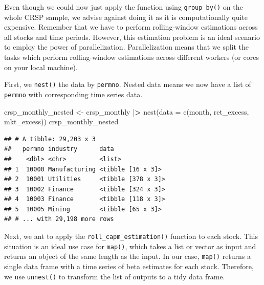 \documentclass[
]{book}
\newenvironment{Shaded}{\begin{snugshade}}{\end{snugshade}}
\newcommand{\AttributeTok}[1]{\textcolor[rgb]{0.61,0.61,0.61}{#1}}
\newcommand{\ErrorTok}[1]{\textcolor[rgb]{0.14,0.14,0.14}{\textbf{#1}}}
\newcommand{\FunctionTok}[1]{\textcolor[rgb]{0,0,0}{#1}}
\newcommand{\NormalTok}[1]{#1}
\newcommand{\OtherTok}[1]{\textcolor[rgb]{0.37,0.37,0.37}{#1}}
\newcommand{\SpecialCharTok}[1]{\textcolor[rgb]{0,0,0}{#1}}
\begin{document}
Even though we could now just apply the function using \texttt{group\_by()} on the whole CRSP sample, we advise against doing it as it is computationally quite expensive.
Remember that we have to perform rolling-window estimations across all stocks and time periods.
However, this estimation problem is an ideal scenario to employ the power of parallelization.
Parallelization means that we split the tasks which perform rolling-window estimations across different workers (or cores on your local machine).

First, we \texttt{nest()} the data by \texttt{permno}. Nested data means we now have a list of \texttt{permno} with corresponding time series data.

\begin{Shaded}
\begin{Highlighting}[]
\NormalTok{crsp\_monthly\_nested }\OtherTok{\textless{}{-}}\NormalTok{ crsp\_monthly }\SpecialCharTok{|}\ErrorTok{\textgreater{}}
  \FunctionTok{nest}\NormalTok{(}\AttributeTok{data =} \FunctionTok{c}\NormalTok{(month, ret\_excess, mkt\_excess))}
\NormalTok{crsp\_monthly\_nested}
\end{Highlighting}
\end{Shaded}

\begin{verbatim}
## # A tibble: 29,203 x 3
##   permno industry      data              
##    <dbl> <chr>         <list>            
## 1  10000 Manufacturing <tibble [16 x 3]> 
## 2  10001 Utilities     <tibble [378 x 3]>
## 3  10002 Finance       <tibble [324 x 3]>
## 4  10003 Finance       <tibble [118 x 3]>
## 5  10005 Mining        <tibble [65 x 3]> 
## # ... with 29,198 more rows
\end{verbatim}

Next, we ant to apply the \texttt{roll\_capm\_estimation()} function to each stock. This situation is an ideal use case for \texttt{map()}, which takes a list or vector as input and returns an object of the same length as the input. In our case, \texttt{map()} returns a single data frame with a time series of beta estimates for each stock. Therefore, we use \texttt{unnest()} to transform the list of outputs to a tidy data frame.
\end{document}
